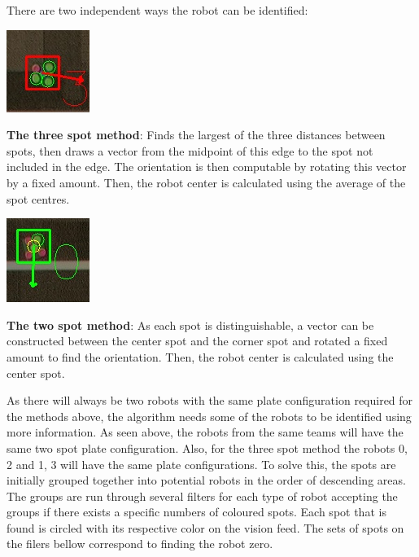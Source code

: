 \documentclass[a4paper,12pt]{article}
\begin{document}
There are two independent ways the robot can be identified:

\begin{minipage}{0.2\textwidth}
\includegraphics[scale=0.7]{3spot.jpg}
\end{minipage}
\begin{minipage}{0.8\textwidth}   
\textbf{The three spot method}: Finds the largest of the three distances between spots, then draws a vector from the midpoint of this edge to the spot not included in the edge. The orientation is then computable by rotating this vector by a fixed amount. Then, the robot center is calculated using the average of the spot centres.
\end{minipage}

\begin{minipage}{0.2\textwidth}
\includegraphics[scale=0.7]{2spot.jpg}
\end{minipage}
\begin{minipage}{0.8\textwidth}
\textbf{The two spot method}: As each spot is distinguishable, a vector can be constructed between the center spot and the corner spot and rotated a fixed amount to find the orientation. Then, the robot center is calculated using the center spot. 
\end{minipage}

\medskip

As there will always be two robots with the same plate configuration required for the methods above, the algorithm needs some of the robots to be identified using more information. As seen above, the robots from the same teams will have the same two spot plate configuration. Also, for the three spot method the robots 0, 2 and 1, 3 will have the same plate configurations. To solve this, the spots are initially grouped together into potential robots in the order of descending areas. The groups are run through several filters for each type of robot accepting the groups if there exists a specific numbers of coloured spots. Each spot that is found is circled with its respective color on the vision feed. The sets of spots on the filers bellow correspond to finding the robot zero.
\end{document}
